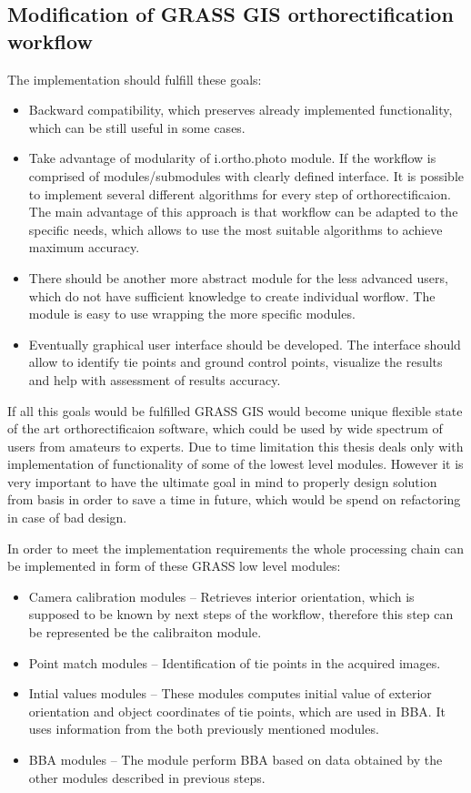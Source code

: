 \documentclass[a4paper,12pt]{article}
\begin{document}
\subsection{Modification of GRASS GIS orthorectification workflow}

The implementation should fulfill these goals:

\begin{itemize}
\item Backward compatibility, which preserves already implemented functionality, which
can be still useful in some cases. 
\item Take advantage of modularity of i.ortho.photo module.
If the workflow is comprised of modules/submodules with clearly defined interface. It is possible to implement
several different algorithms for every step of orthorectificaion. The main advantage of this 
approach is that workflow can be adapted to the specific needs, which allows to use 
the most suitable algorithms to achieve maximum accuracy.
\item There should be another more abstract module for the less advanced users, which do not have sufficient knowledge to create individual 
worflow.
The module is easy to use wrapping the more specific modules.
\item Eventually graphical user interface should be developed. The interface should 
allow to identify tie points and ground control points, visualize the results and help with assessment of results accuracy.  
\end{itemize}

If all this goals would be fulfilled GRASS GIS would become unique flexible state of the art orthorectificaion 
software, which could be used by wide spectrum of users from amateurs to experts.
Due to time limitation this thesis deals only with implementation of functionality of some of the lowest level modules. 
However it is very important to have 
the ultimate goal in mind to properly design solution from basis in order to save a time in future,
which would be spend on refactoring in case of bad design.

In order to meet the implementation requirements the whole processing chain can be implemented in form
of these GRASS low level modules:

\begin{itemize}
\item Camera calibration modules -- Retrieves interior orientation, which is supposed to be known by 
next steps of the workflow, therefore this step can be represented be the calibraiton module.
\item Point match modules -- Identification of tie points in the acquired images.
\item Intial values modules -- These modules computes initial value of exterior orientation and 
object coordinates of tie points, which are used in BBA. It uses information from the both
previously mentioned modules.
\item BBA modules -- The module perform BBA based on data obtained by the other modules described in previous steps.
\end{itemize}
\end{document}
